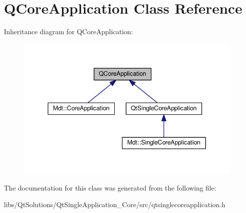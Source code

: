 \hypertarget{class_q_core_application}{}\section{Q\+Core\+Application Class Reference}
\label{class_q_core_application}


Inheritance diagram for Q\+Core\+Application\+:\nopagebreak
\begin{figure}[H]
\begin{center}
\leavevmode
\includegraphics[width=336pt]{class_q_core_application__inherit__graph}
\end{center}
\end{figure}


The documentation for this class was generated from the following file\+:\begin{DoxyCompactItemize}
\item 
libs/\+Qt\+Solutions/\+Qt\+Single\+Application\+\_\+\+Core/src/qtsinglecoreapplication.\+h\end{DoxyCompactItemize}

